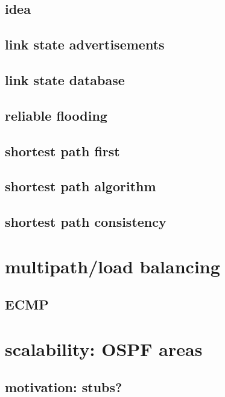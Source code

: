 \subsection{idea}

\subsection{link state advertisements}

\subsection{link state database}

\subsection{reliable flooding}



\subsection{shortest path first}


\subsection{shortest path algorithm}


\subsection{shortest path consistency}


\section{multipath/load balancing}

\subsection{ECMP}

\section{scalability: OSPF areas} %

\subsection{motivation: stubs?}


